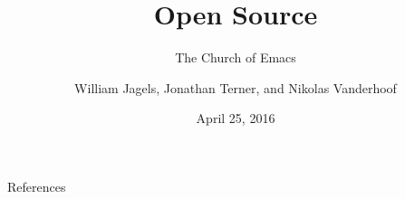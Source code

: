 \documentclass{beamer}
\title{Open Source}
\subtitle{The Church of Emacs}
\author{William Jagels, Jonathan Terner, and Nikolas Vanderhoof}
\institute{Binghamton University}
\date{April 25, 2016}
\begin{document}
\frame{\titlepage}




\begin{frame}[allowframebreaks]{References}
  
  
\end{frame}
\end{document}
